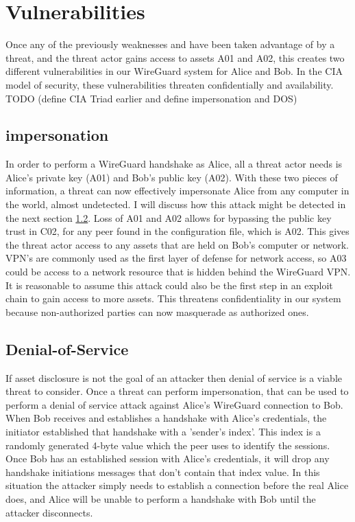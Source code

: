\documentclass [11pt, proquest] {uwthesis}[2020/02/24]
\begin{document}
\section{Vulnerabilities}
Once any of the previously weaknesses and have been taken advantage of by a threat, and the threat actor gains access to assets A01 and A02, this creates two different vulnerabilities in our WireGuard system for Alice and Bob. In the CIA model of security, these vulnerabilities threaten confidentially and availability. TODO (define CIA Triad earlier and define impersonation and DOS)
\subsection{impersonation}
\label{impersonation}
In order to perform a WireGuard handshake as Alice, all a threat actor needs is Alice's private key (A01) and Bob's public key (A02). With these two pieces of information, a threat can now effectively impersonate Alice from any computer in the world, almost undetected. I will discuss how this attack might be detected in the next section \ref{dos}. Loss of A01 and A02 allows for bypassing the public key trust in C02, for any peer found in the configuration file, which is A02. This gives the threat actor access to any assets that are held on Bob's computer or network. VPN's are commonly used as the first layer of defense for network access, so A03 could be access to a network resource that is hidden behind the WireGuard VPN. It is reasonable to assume this attack could also be the first step in an exploit chain to gain access to more assets.
This threatens confidentiality in our system because non-authorized parties can now masquerade as authorized ones.

\subsection{Denial-of-Service}
\label{dos}
If asset disclosure is not the goal of an attacker then denial of service is a viable threat to consider. Once a threat can perform impersonation, that can be used to perform a denial of service attack against Alice's WireGuard connection to Bob. When Bob receives and establishes a handshake with Alice's credentials, the initiator established that handshake with a 'sender's index'. This index is a randomly generated 4-byte value which the peer uses to identify the sessions. Once Bob has an established session with Alice's credentials, it will drop any handshake initiations messages that don't contain that index value. In this situation the attacker simply needs to establish a connection before the real Alice does, and Alice will be unable to perform a handshake with Bob until the attacker disconnects.
\end{document}
